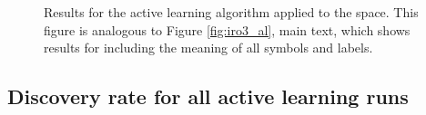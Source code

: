 \begin{figure}[!htb]
\centering
{}
\caption{\label{fig:iro2_al}
%
Results for the active learning algorithm applied to the \IrOtwo space.
%
This figure is analogous to Figure \ref{fig:iro3_al}, main text, which shows results for \IrOthree including the meaning of all symbols and labels.
}
\end{figure}


\subsection{Discovery rate for all active learning runs}
%


